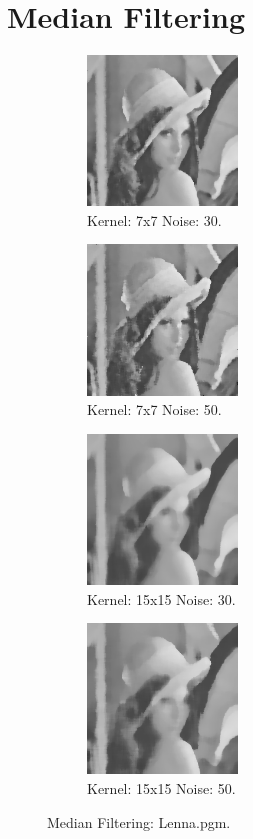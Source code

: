 \documentclass[letterpaper,10pt]{article}
\begin{document}
\section{Median Filtering}
 \begin{figure}[hbtp]
    \centering
    \begin{subfigure}{4cm}
      \includegraphics[width=4cm]{images/median_lenna_7.png}
      \caption{Kernel: 7x7 Noise: 30.}
    \end{subfigure}
    \begin{subfigure}{4cm}
      \includegraphics[width=4cm]{images/median_lenna_7_50.png}
      \caption{Kernel: 7x7 Noise: 50.}
    \end{subfigure}
    \begin{subfigure}{4cm}
      \includegraphics[width=4cm]{images/median_lenna_15.png}
      \caption{Kernel: 15x15 Noise: 30.}
    \end{subfigure}
    \begin{subfigure}{4cm}
      \includegraphics[width=4cm]{images/median_lenna_15_50.png}
      \caption{Kernel: 15x15 Noise: 50.}
    \end{subfigure}
    \caption{Median Filtering: Lenna.pgm.}
    \label{fig:medianlenna}
  \end{figure}
\end{document}

